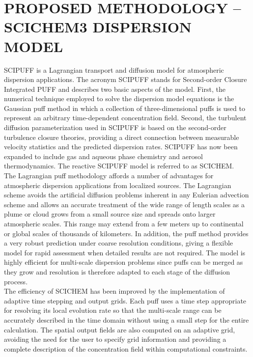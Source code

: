\chapter{PROPOSED METHODOLOGY – SCICHEM3 DISPERSION MODEL}

SCIPUFF is a Lagrangian transport and diffusion model for atmospheric dispersion applications.  The acronym SCIPUFF stands for Second-order Closure Integrated PUFF and describes two basic aspects of the model.  First, the numerical technique employed to solve the dispersion model equations is the Gaussian puff method in which a collection of three-dimensional puffs is used to represent an arbitrary time-dependent concentration field.  Second, the turbulent diffusion parameterization used in SCIPUFF is based on the second-order turbulence closure theories, providing a direct connection between measurable velocity statistics and the predicted dispersion rates. SCIPUFF has now been expanded to include gas and aqueous phase chemistry and aerosol thermodynamics.  The reactive SCIPUFF model is referred to as SCICHEM.\\

The Lagrangian puff methodology affords a number of advantages for atmospheric dispersion applications from localized sources.  The Lagrangian scheme avoids the artificial diffusion problems inherent in any Eulerian advection scheme and allows an accurate treatment of the wide range of length scales as a plume or cloud grows from a small source size and spreads onto larger atmospheric scales. This range may extend from a few meters up to continental or global scales of thousands of kilometers. In addition, the puff method provides a very robust prediction under coarse resolution conditions, giving a flexible model for rapid assessment when detailed results are not required. The model is highly efficient for multi-scale dispersion problems since puffs can be merged as they grow and resolution is therefore adapted to each stage of the diffusion process.\\

The efficiency of SCICHEM has been improved by the implementation of adaptive time stepping and output grids.  Each puff uses a time step appropriate for resolving its local evolution rate so that the multi-scale range can be accurately described in the time domain without using a small step for the entire calculation.  The spatial output fields are also computed on an adaptive grid, avoiding the need for the user to specify grid information and providing a complete description of the concentration field within computational constraints.\\

